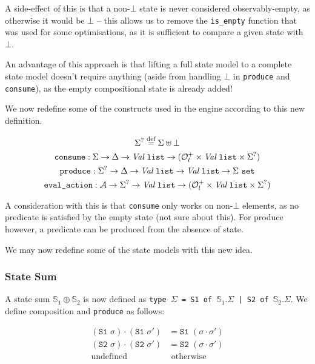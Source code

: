 \documentclass[,a4paper,oneside]{article}
\newcommand{\code}[1]{\texttt{#1}}
\newcommand{\defeq}{\stackrel{\text{def}}=}
\newcommand{\rarr}{\ensuremath{\rightarrow}}
\begin{document}
A side-effect of this is that a non-$\bot$ state is never considered observably-empty, as otherwise it would be $\bot$ -- this allows us to remove the \code{is\_empty} function that was used for some optimisations, as it is sufficient to compare a given state with $\bot$.

An advantage of this approach is that lifting a full state model to a complete state model doesn't require anything (aside from handling $\bot$ in \code{produce} and \code{consume}), as the empty compositional state is already added!

We now redefine some of the constructs used in the engine according to this new definition.

\newcommand{\vallist}[0]{\textit{Val}~\code{list}}

\begin{gather*}
	\Sigma^? \defeq \Sigma \uplus \bot\\
	\code{consume}:\Sigma \rarr \Delta \rarr \vallist \rarr (\mathcal O^+_l \times \vallist \times \Sigma^?) \\
	\code{produce}:\Sigma^? \rarr \Delta \rarr \vallist \rarr \vallist \rarr \Sigma~\code{set}\\
	\code{eval\_action}: {\cal A} \rarr \Sigma^? \rarr \vallist \rarr (\mathcal O^+_l \times \vallist \times \Sigma^?)
\end{gather*}

A consideration with this is that \code{consume} only works on non-$\bot$ elements, as no predicate is satisfied by the empty state (not sure about this). For produce however, a predicate can be produced from the absence of state.

We may now redefine some of the state models with this new idea.

\subsubsection{State Sum}

A state sum $\mathbb S_1 \oplus \mathbb S_2$ is now defined as \code{type $\Sigma$ = S1 of $\mathbb S_1.\Sigma$ | S2 of $\mathbb S_2.\Sigma$}. We define composition and \code{produce} as follows:

\begin{align*}
	(\code{S1 }\sigma)\cdot(\code{S1 }\sigma') &= \code{S1 }(\sigma\cdot\sigma')\\
	(\code{S2 }\sigma)\cdot(\code{S2 }\sigma') &= \code{S2 }(\sigma\cdot\sigma')\\
	\text{undefined}&\text{ otherwise}
\end{align*}
\end{document}
